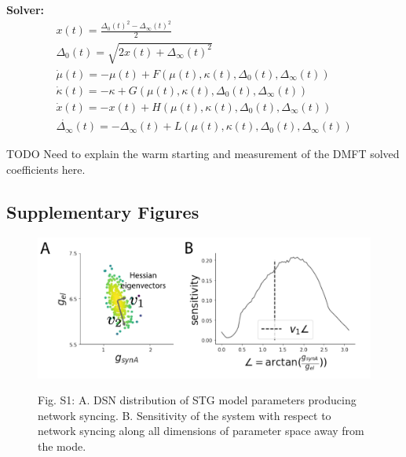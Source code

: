 \documentclass[11pt]{article}
\begin{document}
\textbf{Solver:}
\begin{equation}
\begin{split}
x(t) = \frac{\Delta_0(t)^2-\Delta_\infty(t)^2}{2} \\
\Delta_0(t) = \sqrt{2x(t) + \Delta_\infty(t)^2} \\
\dot{\mu}(t) = -\mu(t) + F(\mu(t), \kappa(t), \Delta_0(t), \Delta_\infty(t)) \\
\dot{\kappa}(t) = -\kappa + G(\mu(t), \kappa(t), \Delta_0(t), \Delta_\infty(t)) \\
\dot{x}(t) = -x(t) + H(\mu(t), \kappa(t), \Delta_0(t), \Delta_\infty(t)) \\
\dot{\Delta_\infty}(t) = -\Delta_\infty(t) + L(\mu(t), \kappa(t), \Delta_0(t), \Delta_\infty(t))
\end{split}
\end{equation}

TODO Need to explain the warm starting and measurement of the DMFT solved coefficients here.

\subsection{Supplementary Figures}

\begin{figure}
\begin{center}
\includegraphics[scale=0.7]{figs/figS1/figS1.pdf}
\end{center}
Fig. S1: A. DSN distribution of STG model parameters producing network syncing.  B. Sensitivity of the system with respect to network syncing along all dimensions of parameter space away from the mode.
\end{figure}
\end{document}
